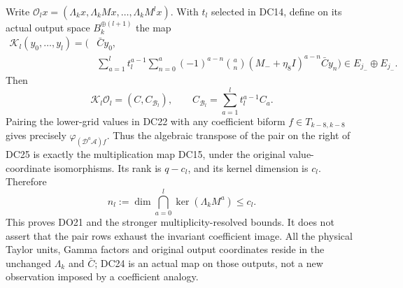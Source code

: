 \documentclass[11pt]{article}
\begin{document}
Write $\mathcal O_lx=(\Lambda_kx,\Lambda_kMx,\ldots,
\Lambda_kM^lx)$.  With $t_l$ selected in DC14, define on its actual
output space $B_k^{\oplus(l+1)}$ the map
\[
 \begin{split}
 \mathcal K_l(y_0,\ldots,y_l)=\biggl(&\bar C y_0,\\[-3pt]
 &\sum_{a=1}^lt_l^{a-1}\sum_{n=0}^a(-1)^{a-n}\binom an
            (M_-+\eta_8I)^{a-n}\bar C y_n\biggr)
      \in E_{j_-}\oplus E_{j_-}.
 \end{split}                                                     \tag{DC24}
\]
Then
\[
 \mathcal K_l\mathcal O_l=(C,C_{\mathcal B_l}),
 \qquad C_{\mathcal B_l}=\sum_{a=1}^lt_l^{a-1}C_a.               \tag{DC25}
\]
Pairing the lower-grid values in DC22 with any coefficient biform
$f\in T_{k-8,k-8}$ gives precisely
$\varphi_{(\mathcal D^a\mathcal A)f}$.  Thus the algebraic transpose
of the pair on the right of DC25 is exactly the multiplication map
DC15, under the original value-coordinate isomorphisms.  Its rank
is $q-c_l$, and its kernel dimension is $c_l$.  Therefore
\[
 n_l:=\dim\bigcap_{a=0}^l\ker(\Lambda_kM^a)\le c_l.            \tag{DC26}
\]
This proves DO21 and the stronger multiplicity-resolved bounds.  It
does not assert that the pair rows exhaust the invariant coefficient
image.  All the physical Taylor units, Gamma factors and original
output coordinates reside in the unchanged $\Lambda_k$ and $\bar C$;
DC24 is an actual map on those outputs, not a new observation imposed
by a coefficient analogy.
\end{document}
